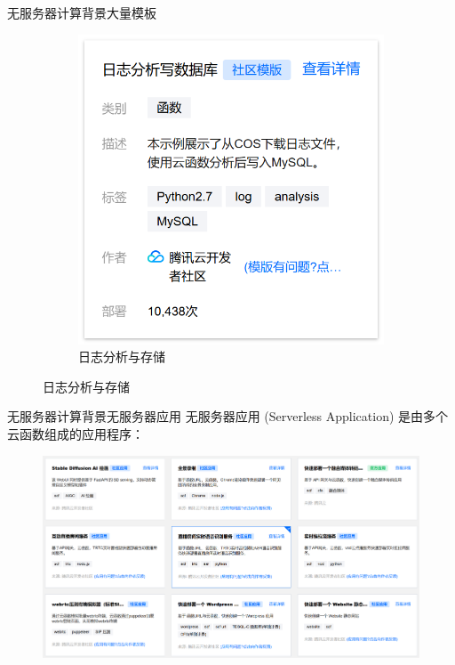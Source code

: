 \documentclass[aspectratio=169]{beamer}
\begin{document}
\begin{frame}{无服务器计算背景}{大量模板}
\begin{figure}
\begin{subfigure}{0.45\textwidth}
      \includegraphics[height=0.7\textheight]{img/serverless-background/scf-template-4.png}
      \caption{日志分析与存储}
    \end{subfigure}
  \end{figure}
\end{frame}

\begin{frame}{无服务器计算背景}{无服务器应用}
  无服务器应用 (Serverless Application) 是由多个云函数组成的应用程序：
  \begin{figure}
    \centering
    \includegraphics[height=0.75\textheight]{img/serverless-background/serverless-applications.png}
  \end{figure}
\end{frame}
\end{document}
